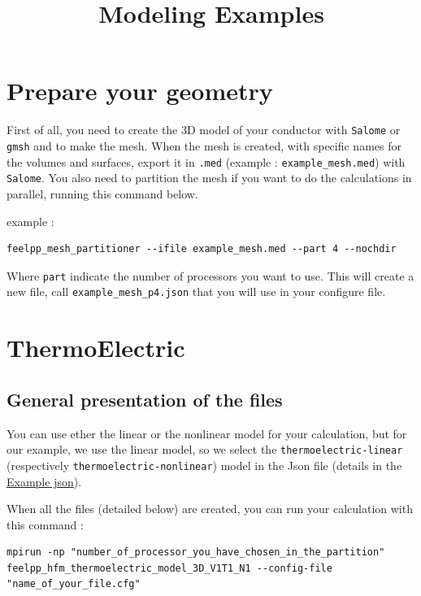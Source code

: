 \documentclass[11pt]{amsart}
\title{Modeling Examples}
\author{}
\date{}
\begin{document}
\maketitle
\tableofcontents
\hypertarget{x-\textbf{prepare-your-geometry}}{\section{\textbf{Prepare your geometry}}}
First of all, you need to create the 3D model of your conductor with \texttt{Salome} or \texttt{gmsh} and to make the mesh.
When the mesh is created, with specific names for the volumes and surfaces, export it in \texttt{.med} (example : \texttt{example\_mesh.med}) with \texttt{Salome}.
You also need to partition the mesh if you want to do the calculations in parallel, running this command below.


example :


\begin{verbatim}
feelpp_mesh_partitioner --ifile example_mesh.med --part 4 --nochdir
\end{verbatim}

Where \texttt{part} indicate the number of processors you want to use.
This will create a new file, call \texttt{example\_mesh\_p4.json} that you will use in your configure file.


\hypertarget{x-\textbf{thermoelectric}}{\section{\textbf{ThermoElectric}}}
\hypertarget{x-general-presentation-of-the-files}{\subsection{General presentation of the files}}
You can use ether the linear or the nonlinear model for your calculation, but for our example, we use the linear model, so we select the \texttt{thermoelectric-linear} (respectively \texttt{thermoelectric-nonlinear}) model in the Json file (details in the \hyperlink{code.json}{Example  json}).


When all the files (detailed below) are created, you can run your calculation with this command :


\begin{verbatim}
mpirun -np "number_of_processor_you_have_chosen_in_the_partition" feelpp_hfm_thermoelectric_model_3D_V1T1_N1 --config-file "name_of_your_file.cfg"
\end{verbatim}
\end{document}
